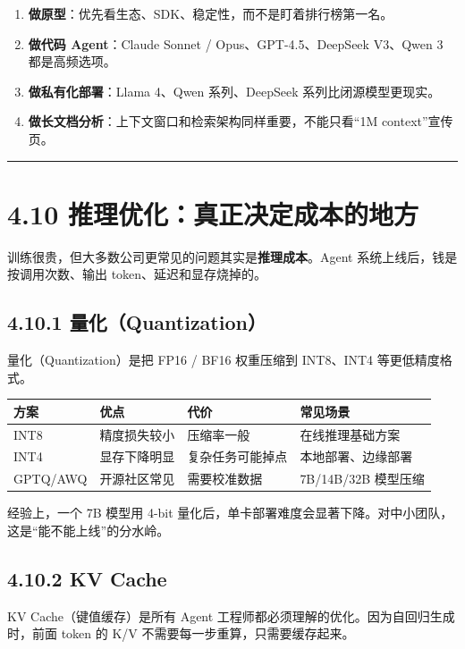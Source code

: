 \begin{enumerate}[leftmargin=2em]
\item \textbf{做原型}：优先看生态、SDK、稳定性，而不是盯着排行榜第一名。
\item \textbf{做代码 Agent}：Claude Sonnet / Opus、GPT-4.5、DeepSeek V3、Qwen 3 都是高频选项。
\item \textbf{做私有化部署}：Llama 4、Qwen 系列、DeepSeek 系列比闭源模型更现实。
\item \textbf{做长文档分析}：上下文窗口和检索架构同样重要，不能只看``1M context''宣传页。
\end{enumerate}

\bigskip\hrule\bigskip

\section{4.10 推理优化：真正决定成本的地方}

训练很贵，但大多数公司更常见的问题其实是\textbf{推理成本}。Agent 系统上线后，钱是按调用次数、输出 token、延迟和显存烧掉的。


\subsection{4.10.1 量化（Quantization）}

量化（Quantization）是把 FP16 / BF16 权重压缩到 INT8、INT4 等更低精度格式。


\begingroup
\scriptsize
\setlength{\tabcolsep}{3pt}
\begin{longtable}{|p{}|p{}|p{}|p{}|}
\hline
方案 & 优点 & 代价 & 常见场景 \\ \hline
INT8 & 精度损失较小 & 压缩率一般 & 在线推理基础方案 \\ \hline
INT4 & 显存下降明显 & 复杂任务可能掉点 & 本地部署、边缘部署 \\ \hline
GPTQ/AWQ & 开源社区常见 & 需要校准数据 & 7B/14B/32B 模型压缩 \\ \hline
\end{longtable}
\endgroup

经验上，一个 7B 模型用 4-bit 量化后，单卡部署难度会显著下降。对中小团队，这是``能不能上线''的分水岭。


\subsection{4.10.2 KV Cache}

KV Cache（键值缓存）是所有 Agent 工程师都必须理解的优化。因为自回归生成时，前面 token 的 K/V 不需要每一步重算，只需要缓存起来。


